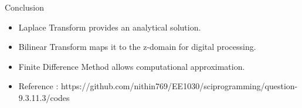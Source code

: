 \documentclass{beamer}
\begin{document}
\begin{frame}{Conclusion}
	\begin{itemize}
		\item Laplace Transform provides an analytical solution.
		\item Bilinear Transform maps it to the z-domain for digital processing.
		\item Finite Difference Method allows computational approximation.
		\item \footnotesize Reference : https://github.com/nithin769/EE1030/sciprogramming/question-9.3.11.3/codes
	\end{itemize}
\end{frame}
\end{document}
